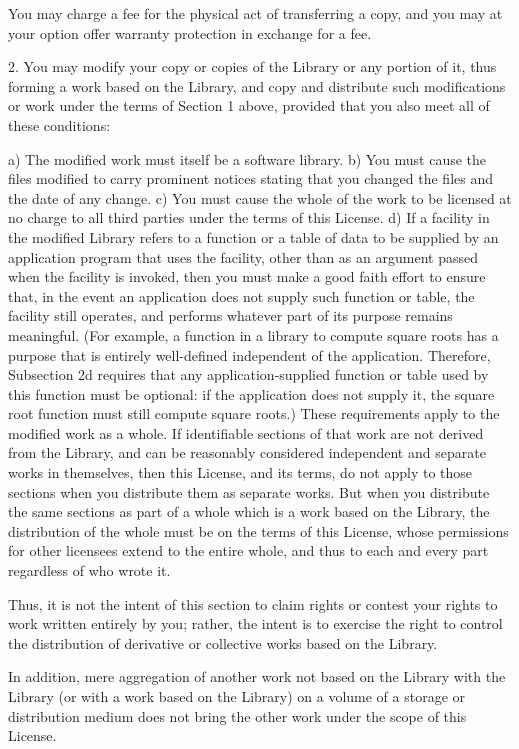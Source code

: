 \begin{DoxyVerb}
You may charge a fee for the physical act of transferring a copy, and you may at your option offer
warranty protection in exchange for a fee.

2. You may modify your copy or copies of the Library or any portion of it, thus forming a work based
on the Library, and copy and distribute such modifications or work under the terms of Section 1
above, provided that you also meet all of these conditions:

a) The modified work must itself be a software library.
b) You must cause the files modified to carry prominent notices stating that you changed the files
and the date of any change.
c) You must cause the whole of the work to be licensed at no charge to all third parties under the
terms of this License.
d) If a facility in the modified Library refers to a function or a table of data to be supplied by
an application program that uses the facility, other than as an argument passed when the facility is
invoked, then you must make a good faith effort to ensure that, in the event an application does
not supply such function or table, the facility still operates, and performs whatever part of its
purpose remains meaningful.
(For example, a function in a library to compute square roots has a purpose that is entirely
well-defined independent of the application. Therefore, Subsection 2d requires that any
application-supplied function or table used by this function must be optional: if the application
does not supply it, the square root function must still compute square roots.)
These requirements apply to the modified work as a whole. If identifiable sections of that work are
not derived from the Library, and can be reasonably considered independent and separate works in
themselves, then this License, and its terms, do not apply to those sections when you distribute
them as separate works. But when you distribute the same sections as part of a whole which is a work
based on the Library, the distribution of the whole must be on the terms of this License, whose
permissions for other licensees extend to the entire whole, and thus to each and every part
regardless of who wrote it.

Thus, it is not the intent of this section to claim rights or contest your rights to work written
entirely by you; rather, the intent is to exercise the right to control the distribution of
derivative or collective works based on the Library.

In addition, mere aggregation of another work not based on the Library with the Library (or with a
work based on the Library) on a volume of a storage or distribution medium does not bring the other
work under the scope of this License.


\end{DoxyVerb}

